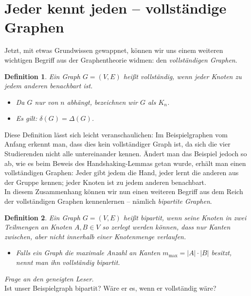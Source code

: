 \documentclass{article}
\newtheorem{definition}{Definition}
\begin{document}
\section{Jeder kennt jeden -- vollständige Graphen}
Jetzt, mit etwas Grundwissen gewappnet, können wir uns einem weiteren wichtigen Begriff aus der Graphentheorie widmen: den \emph{vollständigen Graphen}.\\
\begin{definition}
	Ein Graph $G = (V, E)$ heißt \emph{vollständig}, wenn jeder Knoten zu jedem anderen benachbart ist.
	\begin{itemize}
		\item[$\rightarrow$] Da $G$ nur von $n$ abhängt, bezeichnen wir $G$ als $K_n$.
		\item[$\rightarrow$] Es gilt: $\delta(G) = \Delta(G)$.
	\end{itemize}
\end{definition}
\bigskip
Diese Definition lässt sich leicht veranschaulichen: Im Beispielgraphen vom Anfang erkennt man, dass dies kein vollständiger Graph ist, da sich die vier Studierenden nicht alle untereinander kennen. Ändert man das Beispiel jedoch so ab, wie es beim Beweis des Handshaking-Lemmas getan wurde, erhält man einen vollständigen Graphen: Jeder gibt jedem die Hand, jeder lernt die anderen aus der Gruppe kennen; jeder Knoten ist zu jedem anderen benachbart.\\
\bigskip
In diesem Zusammenhang können wir nun einen weiteren Begriff aus dem Reich der vollständigen Graphen kennenlernen -- nämlich \emph{bipartite Graphen}.\\
\begin{definition}
	Ein Graph $G = (V, E)$ heißt \emph{bipartit}, wenn seine Knoten in zwei Teilmengen an Knoten $A, B \in V$ so zerlegt werden können, dass nur Kanten \emph{zwischen}, aber nicht \emph{innerhalb} einer Knotenmenge verlaufen.
	\begin{itemize}
		\item[$\rightarrow$] Falls ein Graph die \emph{maximale Anzahl an Kanten} $m_{\mathrm{max}} = |A| \cdot |B|$ besitzt, nennt man ihn \emph{vollständig bipartit}.
	\end{itemize}
\end{definition}
\bigskip
\emph{Frage an den geneigten Leser.}\\
Ist unser Beispielgraph bipartit? Wäre er es, wenn er vollständig wäre?\\
\newpage
\end{document}
